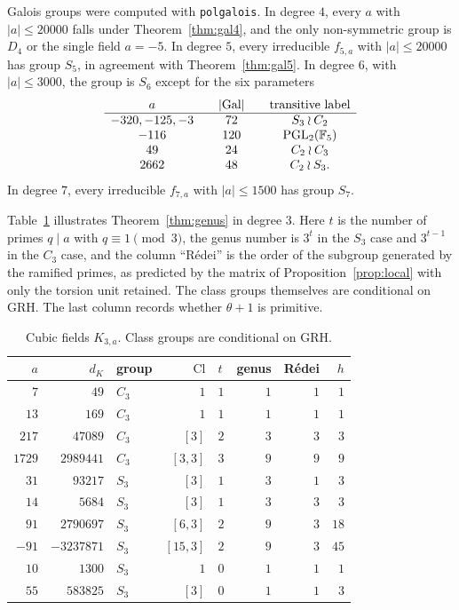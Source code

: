 \documentclass[11pt]{article}
\theoremstyle{definition}
\theoremstyle{remark}
\newcommand{\F}{\mathbb{F}}
\newcommand{\Gal}{\mathrm{Gal}}
\begin{document}
Galois groups were computed with \texttt{polgalois}. In degree $4$, every
$a$ with $|a|\le 20000$ falls under Theorem~\ref{thm:gal4}, and the only
non-symmetric group is $D_4$ or the single field $a=-5$. In degree $5$, every
irreducible $f_{5,a}$ with $|a|\le 20000$ has group $S_5$, in agreement with
Theorem~\ref{thm:gal5}. In degree $6$, with $|a|\le 3000$, the group is $S_6$
except for the six parameters
\[
\begin{array}{c@{\qquad}c@{\qquad}c}
a & |\Gal| & \text{transitive label}\\
\hline
-320,-125,-3 & 72 & S_3\wr C_2\\
-116 & 120 & \mathrm{PGL}_2(\F_5)\\
49 & 24 & C_2\wr C_3\\
2662 & 48 & C_2\wr S_3.
\end{array}
\]
In degree $7$, every irreducible $f_{7,a}$ with $|a|\le 1500$ has group $S_7$.

Table~\ref{tab:cubic} illustrates Theorem~\ref{thm:genus} in degree $3$. Here
$t$ is the number of primes $q\mid a$ with $q\equiv 1\pmod 3$, the genus number
is $3^{t}$ in the $S_3$ case and $3^{t-1}$ in the $C_3$ case, and the column
``R\'edei'' is the order of the subgroup generated by the ramified primes, as
predicted by the matrix of Proposition~\ref{prop:local} with only the torsion
unit retained. The class groups themselves are conditional on GRH. The last
column records whether $\theta+1$ is primitive.

\begin{table}[ht]
\centering
\caption{Cubic fields $K_{3,a}$. Class groups are conditional on GRH.}
\label{tab:cubic}
\small
\begin{tabular}{@{}rrlrlrrr@{}}
\toprule
$a$ & $d_K$ & group & $\mathrm{Cl}$ & $t$ & genus & R\'edei & $h$\\
\midrule
$7$ & $49$ & $C_3$ & $1$ & $1$ & $1$ & $1$ & $1$\\
$13$ & $169$ & $C_3$ & $1$ & $1$ & $1$ & $1$ & $1$\\
$217$ & $47089$ & $C_3$ & $[3]$ & $2$ & $3$ & $3$ & $3$\\
$1729$ & $2989441$ & $C_3$ & $[3,3]$ & $3$ & $9$ & $9$ & $9$\\
$31$ & $93217$ & $S_3$ & $[3]$ & $1$ & $3$ & $1$ & $3$\\
$14$ & $5684$ & $S_3$ & $[3]$ & $1$ & $3$ & $3$ & $3$\\
$91$ & $2790697$ & $S_3$ & $[6,3]$ & $2$ & $9$ & $3$ & $18$\\
$-91$ & $-3237871$ & $S_3$ & $[15,3]$ & $2$ & $9$ & $3$ & $45$\\
$10$ & $1300$ & $S_3$ & $1$ & $0$ & $1$ & $1$ & $1$\\
$55$ & $583825$ & $S_3$ & $[3]$ & $0$ & $1$ & $1$ & $3$\\
\bottomrule
\end{tabular}
\end{table}
\end{document}
